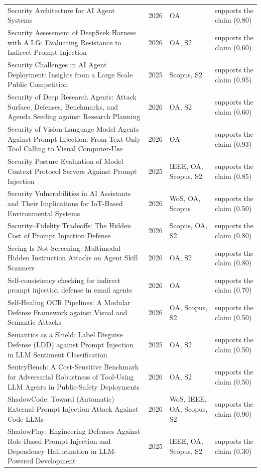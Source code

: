 \begin{longtable}{@{}%
  >{\raggedright\arraybackslash}p{}c%
  >{\raggedright\arraybackslash}p{}%
  >{\raggedright\arraybackslash}p{}@{}}
Security Architecture for AI Agent Systems & 2026 & OA & supports the claim (0.80) \\
Security Assessment of DeepSeek Harness with A.I.G: Evaluating Resistance to Indirect Prompt Injection & 2026 & OA, S2 & supports the claim (0.60) \\
Security Challenges in AI Agent Deployment: Insights from a Large Scale Public Competition & 2025 & Scopus, S2 & supports the claim (0.95) \\
Security of Deep Research Agents: Attack Surface, Defenses, Benchmarks, and Agenda Seeding against Research Planning & 2026 & OA, S2 & supports the claim (0.60) \\
Security of Vision-Language Model Agents Against Prompt Injection: From Text-Only Tool Calling to Visual Computer-Use & 2026 & OA & supports the claim (0.93) \\
Security Posture Evaluation of Model Context Protocol Servers Against Prompt Injection & 2025 & IEEE, OA, Scopus, S2 & supports the claim (0.85) \\
Security Vulnerabilities in AI Assistants and Their Implications for IoT-Based Environmental Systems & 2026 & WoS, OA, Scopus & supports the claim (0.50) \\
Security--Fidelity Tradeoffs: The Hidden Cost of Prompt Injection Defense & 2026 & Scopus, OA, S2 & supports the claim (0.80) \\
Seeing Is Not Screening: Multimodal Hidden Instruction Attacks on Agent Skill Scanners & 2026 & OA, S2 & supports the claim (0.80) \\
Self-consistency checking for indirect prompt injection defense in email agents & 2026 & OA & supports the claim (0.70) \\
Self-Healing OCR Pipelines: A Modular Defense Framework against Visual and Semantic Attacks & 2026 & OA, Scopus, S2 & supports the claim (0.50) \\
Semantics as a Shield: Label Disguise Defense (LDD) against Prompt Injection in LLM Sentiment Classification & 2025 & OA, S2 & supports the claim (0.50) \\
SentryBench: A Cost-Sensitive Benchmark for Adversarial Robustness of Tool-Using LLM Agents in Public-Safety Deployments & 2026 & OA, S2 & supports the claim (0.50) \\
ShadowCode: Toward (Automatic) External Prompt Injection Attack Against Code LLMs & 2026 & WoS, IEEE, OA, Scopus, S2 & supports the claim (0.90) \\
ShadowPlay: Engineering Defenses Against Role-Based Prompt Injection and Dependency Hallucination in LLM-Powered Development & 2025 & IEEE, OA, Scopus, S2 & supports the claim (0.30) \\

\end{longtable}
